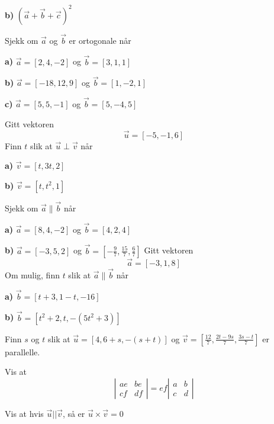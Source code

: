 \textbf{b)} $ (\vec{a}+ \vec{b}+\vec{c})^2$

\nes
{}
Sjekk om $ \vec{a} $ og $ \vec{b} $ er ortogonale når\os

\textbf{a)} $ \vec{a}=[2, 4, -2] $ og $ \vec{b}=[3, 1, 1] $\os

\textbf{b)} $ \vec{a}=[-18, 12, 9] $ og $ \vec{b}=[1, -2, 1] $\os

\textbf{c)} $ \vec{a}=[5, 5, -1] $ og $ \vec{b}=[5, -4, 5] $

Gitt vektoren
\[ \vec{u}=[-5, -1, 6] \]
Finn $ t $ slik at $ \vec{u}\perp \vec{v} $ når\os

\textbf{a)} $ \vec{v}=[t, 3t, 2] $\os

\textbf{b)} $ \vec{v}=[t, t^2, 1] $

Sjekk om $ \vec{a}\parallel\vec{b} $ når\os

\textbf{a)} $ \vec{a}=[8, 4, -2] $ og $ \vec{b}=[4, 2, 4] $\os

\textbf{b)} $ \vec{a}=[-3, 5, 2] $ og $ \vec{b}=\left[-\frac{9}{7}, \frac{15}{7}, \frac{6}{7}\right] $ 
\newpage
{}
Gitt vektoren 
\[ \vec{a}=[-3, 1, 8] \]
Om mulig, finn $ t $ slik at $ \vec{a}\parallel\vec{b} $ når\os

\textbf{a)} $ \vec{b}=[t+3, 1-t, -16] $\os

\textbf{b)} $ \vec{b}=[t^2+2, t, -(5t^2+3)] $

Finn $ s $ og $ t $ slik at $\vec{u}=[4, 6+s, -(s+t)] $ og $ \vec{v}=\left[\frac{12}{7}, \frac{2t-9s}{7}, \frac{3s-t}{7}\right] $ er parallelle. \os

\nes
{}
Vis at
\[  \left|\begin{matrix}
ae & be \\
cf & df
\end{matrix}\right|=ef\left|\begin{matrix}
a & b \\
c & d
\end{matrix}\right| \]

\begin{comment}
\op{arparo}
Finn aralet til parallellogrammet utspent av (\textsl{Tips:} Bruk resultatet fra opg. \ref{vis22det}):

\textbf{a)} $ [-2, 7] $ og $ [12, 8] $

\textbf{b)} $ [-2, 4] $ og $ [24, -16] $\\
\end{comment}

Vis at hvis $ \vec{u}||\vec{v} $, så er $ \vec{u}\times\vec{v}=0 $


